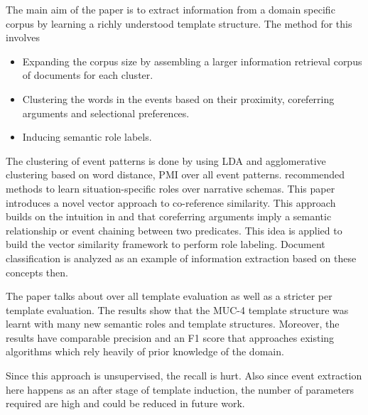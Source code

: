 The main aim of the paper is to extract information from a domain specific corpus by learning a richly understood template structure. The method for this involves
\begin{itemize}
\item Expanding the corpus size by assembling a larger information retrieval corpus of
documents for each cluster. 
\item Clustering the words in the events based on their
proximity, coreferring arguments and selectional preferences. 
\item Inducing semantic role
labels.
\end{itemize}

The clustering of event patterns is done by using LDA and agglomerative clustering based on word distance, PMI over all event patterns. \citeauthor {chju2009} recommended methods to learn situation-specific roles over narrative schemas. This paper introduces a novel vector approach to co-reference similarity. This approach builds on the intuition in \citeauthor {chju2008} and \citeauthor {chju2009} that coreferring arguments imply a semantic relationship or event chaining between two predicates. This idea is applied to build the vector similarity framework to perform role labeling. Document classification is analyzed as an example of information extraction based on these concepts then.

The paper talks about over all template evaluation as well as a stricter per template evaluation. The results show that the MUC-4 template structure was learnt with many new semantic roles and template structures. Moreover, the results have comparable precision and an F1 score that approaches existing algorithms which rely heavily of prior knowledge of the domain.

Since this approach is unsupervised, the recall is hurt. Also since event extraction here happens as an after stage of template induction, the number of parameters required are high and could be reduced in future work.


